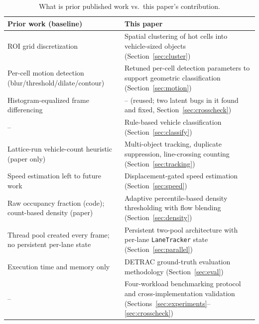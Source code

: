\documentclass[conference]{IEEEtran}
\newcommand{\code}[1]{\texttt{#1}}
\begin{document}
\begin{table}[t]
\centering
\caption{What is prior published work \cite{baseline} vs.\ this
paper's contribution.}
\label{tab:baseline-vs-contribution}
\footnotesize
\begin{tabular}{p{3.9cm}p{3.6cm}}
\toprule
\textbf{Prior work \cite{baseline} (baseline)} & \textbf{This paper} \\
\midrule
ROI grid discretization &
Spatial clustering of hot cells into vehicle-sized objects
(Section~\ref{sec:cluster}) \\
Per-cell motion detection (blur/threshold/dilate/contour) &
Retuned per-cell detection parameters to support geometric classification
(Section~\ref{sec:motion}) \\
Histogram-equalized frame differencing &
-- (reused; two latent bugs in it found and fixed, Section~\ref{sec:crosscheck}) \\
-- &
Rule-based vehicle classification (Section~\ref{sec:classify}) \\
Lattice-run vehicle-count heuristic (paper only) &
Multi-object tracking, duplicate suppression, line-crossing counting
(Section~\ref{sec:tracking}) \\
Speed estimation left to future work &
Displacement-gated speed estimation (Section~\ref{sec:speed}) \\
Raw occupancy fraction (code); count-based density (paper) &
Adaptive percentile-based density thresholding with flow blending
(Section~\ref{sec:density}) \\
Thread pool created every frame; no persistent per-lane state &
Persistent two-pool architecture with per-lane
\code{LaneTracker} state (Section~\ref{sec:parallel}) \\
Execution time and memory only &
DETRAC ground-truth evaluation methodology (Section~\ref{sec:eval}) \\
-- &
Four-workload benchmarking protocol and cross-implementation
validation (Sections~\ref{sec:experiments}--\ref{sec:crosscheck}) \\
\bottomrule
\end{tabular}
\end{table}
\end{document}
